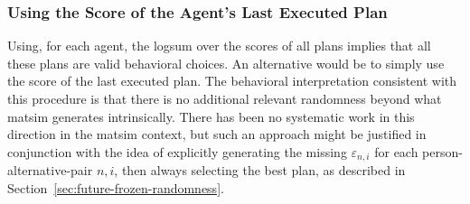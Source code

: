 

\subsubsection{Using the Score of the Agent's Last Executed Plan}
\label{ch:economicEval:valuingBehavior:output2Eval:executed}
Using, for each agent, the logsum over the scores of all plans implies that all these plans are valid behavioral choices.  An alternative would be to simply use the score of the last executed plan.  The behavioral interpretation consistent with this procedure is that there is no additional relevant randomness beyond what \acrshort{matsim} generates intrinsically.  There has  been no systematic work in this direction in the \acrshort{matsim} context, but such an approach might be justified 
in conjunction 
with the idea of explicitly generating the missing $\varepsilon_{n,i}$ for each person-alternative-pair $n,i$,  then always selecting the best plan, as described in Section~\ref{sec:future-frozen-randomness}.



